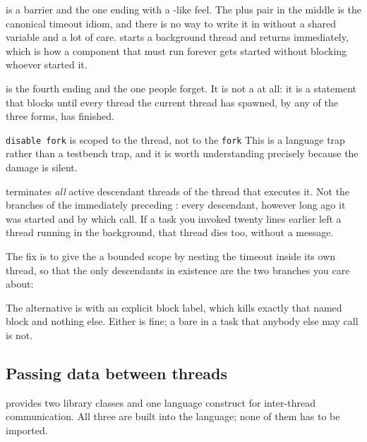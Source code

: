  is a barrier and the one ending with a \VHDL{}-like feel. The
 plus  pair in the middle is the canonical
timeout idiom, and there is no way to write it in \VHDL{} without a shared
variable and a lot of care.  starts a background thread and
returns immediately, which is how a component that must run forever gets
started without blocking whoever started it.

 is the fourth ending and the one people forget. It is not a
 at all: it is a statement that blocks until every thread the
current thread has spawned, by any of the three forms, has finished.

\begin{gotcha}{\texttt{disable fork} is scoped to the thread, not to the \texttt{fork}}
This is a language trap rather than a testbench trap, and it is worth
understanding precisely because the damage is silent.

 terminates \emph{all} active descendant threads of the
thread that executes it. Not the branches of the immediately preceding
: every descendant, however long ago it was started and by which
call. If a task you invoked twenty lines earlier left a 
thread running in the background, that thread dies too, without a message.

The fix is to give the  a bounded scope by nesting the timeout
inside its own thread, so that the only descendants in existence are the two
branches you care about:


The alternative is  with an explicit block label, which kills
exactly that named block and nothing else. Either is fine; a bare
 in a task that anybody else may call is not.
\end{gotcha}

\subsection{Passing data between threads}

\SV{} provides two library classes and one language construct for
inter-thread communication. All three are built into the language; none of
them has to be imported.

